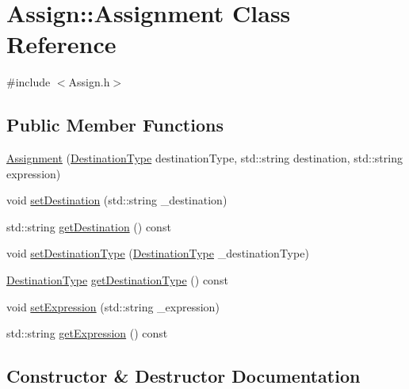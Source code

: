 \hypertarget{class_assign_1_1_assignment}{}\section{Assign\+:\+:Assignment Class Reference}
\label{class_assign_1_1_assignment}


{\ttfamily \#include $<$Assign.\+h$>$}

\subsection*{Public Member Functions}
\begin{DoxyCompactItemize}
\item 
\hyperlink{class_assign_1_1_assignment_a41583f4bbce99b1d95f4ef067c236f7a}{Assignment} (\hyperlink{class_assign_ae0f42117c12a8d0bc2bf0b7574070694}{Destination\+Type} destination\+Type, std\+::string destination, std\+::string expression)
\item 
void \hyperlink{class_assign_1_1_assignment_a8d0c9b18c0b1258bba905b4e47a2659b}{set\+Destination} (std\+::string \+\_\+destination)
\item 
std\+::string \hyperlink{class_assign_1_1_assignment_a6cf7ecd2950dfc709985a1ede3773be8}{get\+Destination} () const 
\item 
void \hyperlink{class_assign_1_1_assignment_a9688ea3171c85ccbcdf0ed9d87ad9cc7}{set\+Destination\+Type} (\hyperlink{class_assign_ae0f42117c12a8d0bc2bf0b7574070694}{Destination\+Type} \+\_\+destination\+Type)
\item 
\hyperlink{class_assign_ae0f42117c12a8d0bc2bf0b7574070694}{Destination\+Type} \hyperlink{class_assign_1_1_assignment_a46493b98c1cd97ce4b015640bf34dd27}{get\+Destination\+Type} () const 
\item 
void \hyperlink{class_assign_1_1_assignment_aa36ca609362d3deedffbefd9cceb12e6}{set\+Expression} (std\+::string \+\_\+expression)
\item 
std\+::string \hyperlink{class_assign_1_1_assignment_a724dc03a686c4d53d57ee45b7617ae2f}{get\+Expression} () const 
\end{DoxyCompactItemize}


\subsection{Constructor \& Destructor Documentation}

